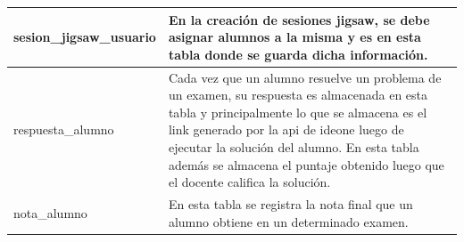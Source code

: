 \begin{longtable}{|L{4cm}|L{9cm}|}
	\midrule
	sesion\_jigsaw\_usuario & En la creación de sesiones jigsaw, se debe asignar alumnos a la misma y es en esta tabla donde se guarda dicha información.\\
	\midrule
	respuesta\_alumno & Cada vez que un alumno resuelve un problema de un examen, su respuesta es almacenada en esta tabla y principalmente lo que se almacena es el link generado por la api de ideone luego de ejecutar la solución del alumno. En esta tabla además se almacena el puntaje obtenido luego que el docente califica la solución.\\
	\midrule
	nota\_alumno & En esta tabla se registra la nota final que un alumno obtiene en un determinado examen.\\
	\bottomrule[0.7mm]
\end{longtable}